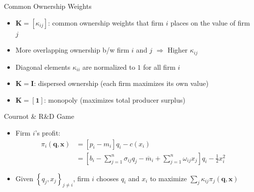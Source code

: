 \documentclass[
  10pt, %
  aspectratio=169,  %
  handout
]{beamer}
\theoremstyle{plain}
\begin{document}
\begin{frame}{Common Ownership Weights}
  \label{ownership_weight}
  \begin{itemize}
    \item $\boldsymbol{K}=\left[\kappa_{ij}\right]$: common ownership weights that firm $i$ places on the value of firm $j$
    \medskip{}
    \item More overlapping ownership b/w firm $i$ and $j$ $\Longrightarrow$ Higher $\kappa_{ij}$ \hfill\hyperlink{rotemberg}{}
    \medskip{}
    \item Diagonal elements $\kappa_{ii}$ are normalized to $1$ for all firm $i$
    \medskip{}
    \item $\boldsymbol{K}=\boldsymbol{I}$: dispersed ownership (each firm maximizes its own value)
    \medskip{}
    \item  $\boldsymbol{K=[1]}$: monopoly (maximizes total producer surplus)
  \end{itemize}
\end{frame}

\begin{frame}{Cournot \& R\&D Game}
  \begin{itemize}
    \item Firm $i$'s profit:
    \begin{align*}
      \pi_{i}(\boldsymbol{q}, \boldsymbol{x}) & = [p_i - m_i]q_{i}  - c(x_i) \\
                                     & = \left[ b_{i} - \sum_{j=1}^{n} \sigma_{ij} q_{j} - \overline{m}_{i} + \sum_{j=1}^{n} \omega_{ij} x_{j} \right]q_{i} - \frac{1}{2}x_{i}^{2}
  \end{align*}
    \item  Given $\left\{ q_{j}, x_{j}\right\} _{j\neq i}$,
    firm $i$ chooses $q_{i}$ and $x_{i}$ to maximize
    $\sum_{j}\kappa_{ij}\pi_{j}(\boldsymbol{q}, \boldsymbol{x}) $
  \end{itemize}
\end{frame}
\end{document}
